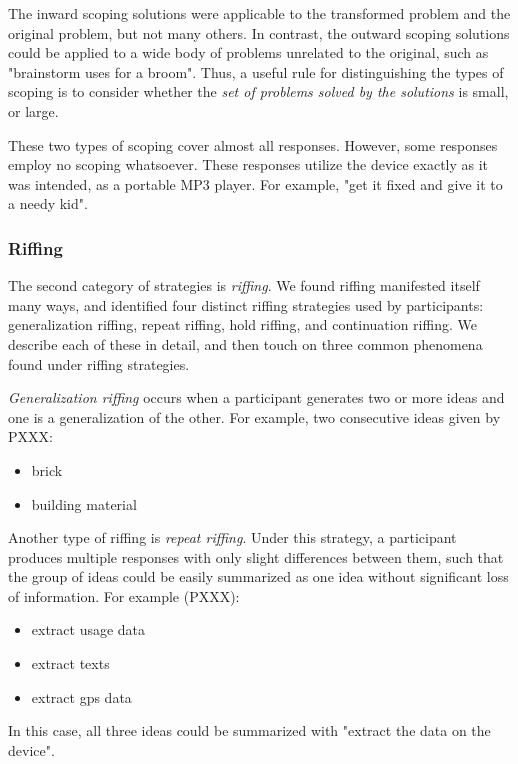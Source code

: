 The inward scoping solutions were applicable to the transformed problem and the original problem, but not many others. In contrast, the outward scoping solutions could be applied to a wide body of problems unrelated to the original, such as "brainstorm uses for a broom". Thus, a useful rule for distinguishing the types of scoping is to consider whether the \emph{set of problems solved by the solutions} is small, or large.

These two types of scoping cover almost all responses. However, some responses employ no scoping whatsoever. These responses utilize the device exactly as it was intended, as a portable MP3 player. For example, "get it fixed and give it to a needy kid".

\subsubsection{Riffing}

The second category of strategies is \emph{riffing}.
We found riffing manifested itself many ways, and identified four distinct riffing strategies used by participants: generalization riffing, repeat riffing, hold riffing, and continuation riffing. We describe each of these in detail, and then touch on three common phenomena found under riffing strategies.

\emph{Generalization riffing} occurs when a participant generates two or more ideas and one is a generalization of the other. For example, two consecutive ideas given by PXXX:

\begin{itemize}
    \item brick
    \item building material
\end{itemize}

Another type of riffing is \emph{repeat riffing}. Under this strategy, a participant produces multiple responses with only slight differences between them, such that the group of ideas could be easily summarized as one idea without significant loss of information. For example (PXXX):

\begin{itemize}
    \item extract usage data
    \item extract texts
    \item extract gps data
\end{itemize}

In this case, all three ideas could be summarized with "extract the data on the device".

